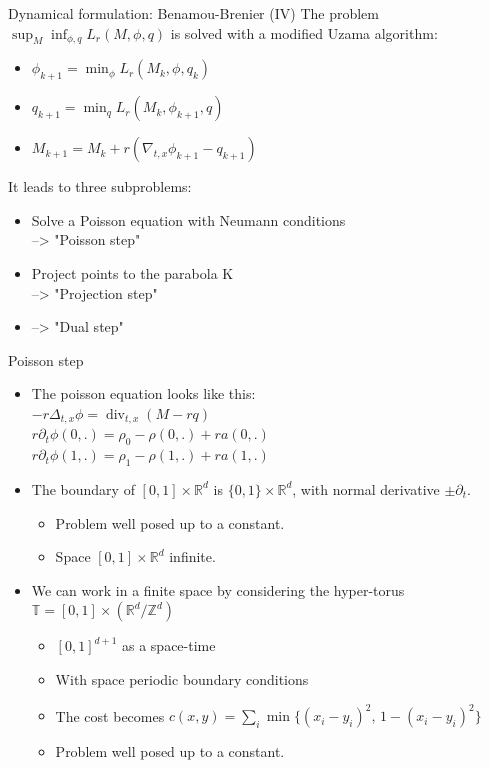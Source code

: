\documentclass{beamer}
\DeclareMathOperator*{\divergence}{div}
\newcommand{\R}{\mathbb{R}}
\newcommand{\Z}{\mathbb{Z}}
\newcommand{\T}{\mathbb{T}}
\begin{document}
\begin{frame}{Dynamical formulation: Benamou-Brenier (IV)}
    The problem $\sup_{M}\inf_{\phi,q} L_r(M,\phi,q)$ is solved with a modified Uzama algorithm:
    \begin{itemize}
       \item $\phi_{k+1} = \min_\phi L_r(M_k,\phi,q_k) $ 
       \item $q_{k+1} = \min_q L_r(M_k,\phi_{k+1},q)$
       \item $M_{k+1} = M_{k} + r(\nabla_{t,x}\phi_{k+1}-q_{k+1})$
    \end{itemize}
    It leads to three subproblems:
    \begin{itemize}
        \item Solve a Poisson equation with Neumann conditions \\ –> "Poisson step"
        \item  Project points to the parabola K \\ –> "Projection step"
        \item –> "Dual step"
    \end{itemize}
\end{frame}

\begin{frame}{Poisson step}
\begin{itemize}
    \item The poisson equation looks like this:\\ $-r\Delta_{t,x}\phi = \divergence_{t,x}(M-rq)$ \\
    $r\partial_t\phi(0,.) = \rho_0 - \rho(0,.) + ra(0,.)$\\
    $r\partial_t\phi(1,.) = \rho_1 - \rho(1,.) + ra(1,.)$
    \item The boundary of $[0,1]\times\R^d$ is $\{0,1\}\times\R^d$, with normal derivative $\pm\partial_t$.
    \begin{itemize}
    \item Problem well posed up to a constant.
    \item Space $[0,1]\times\R^d$ infinite. 
    \end{itemize}
    \item We can work in a finite space by considering the hyper-torus $\T=[0,1]\times(\R^d/\Z^d)$
    \begin{itemize}
        \item $[0,1]^{d+1}$ as a space-time
        \item With space periodic boundary conditions
        \item The cost becomes 
        $c(x,y) = \sum_i\min\{(x_i-y_i)^2,\,1-(x_i-y_i)^2\}$
        \item Problem well posed up to a constant.
    \end{itemize}
\end{itemize}
\end{frame}
\end{document}
